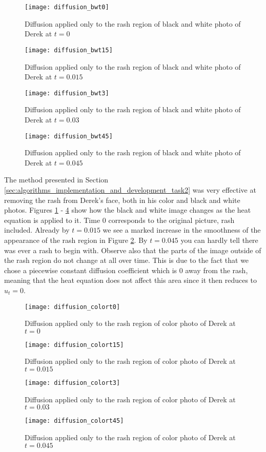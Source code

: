 \documentclass[fleqn,10pt]{../SelfArx} %
\begin{document}
\begin{figure}
\centering
\texttt{[image: diffusion\_bwt0]}
\caption{Diffusion applied only to the rash region of black and white photo of Derek at $t=0$}
\label{fig:diffusion_bwt0}
\end{figure}
\begin{figure}
\centering
\texttt{[image: diffusion\_bwt15]}
\caption{Diffusion applied only to the rash region of black and white photo of Derek at $t=0.015$}
\label{fig:diffusion_bwt15}
\end{figure}
\begin{figure}
\centering
\texttt{[image: diffusion\_bwt3]}
\caption{Diffusion applied only to the rash region of black and white photo of Derek at $t=0.03$}
\label{fig:diffusion_bwt3}
\end{figure}
\begin{figure}
\centering
\texttt{[image: diffusion\_bwt45]}
\caption{Diffusion applied only to the rash region of black and white photo of Derek at $t=0.045$}
\label{fig:diffusion_bwt45}
\end{figure}

The method presented in Section \ref{sec:algorithms_implementation_and_development_task2} was very effective at removing the rash from Derek's face, both in his color and black and white photos. Figures \ref{fig:diffusion_bwt0} - \ref{fig:diffusion_bwt45} show how the black and white image changes as the heat equation is applied to it. Time 0 corresponds to the original picture, rash included. Already by $t=0.015$ we see a marked increase in the smoothness of the appearance of the rash region in Figure \ref{fig:diffusion_bwt15}. By $t=0.045$ you can hardly tell there was ever a rash to begin with. Observe also that the parts of the image outside of the rash region do not change at all over time. This is due to the fact that we chose a piecewise constant diffusion coefficient which is 0 away from the rash, meaning that the heat equation does not affect this area since it then reduces to $u_t = 0$.

\begin{figure}
\centering
\texttt{[image: diffusion\_colort0]}
\caption{Diffusion applied only to the rash region of color photo of Derek at $t=0$}
\label{fig:diffusion_colort0}
\end{figure}
\begin{figure}
\centering
\texttt{[image: diffusion\_colort15]}
\caption{Diffusion applied only to the rash region of color photo of Derek at $t=0.015$}
\label{fig:diffusion_colort15}
\end{figure}
\begin{figure}
\centering
\texttt{[image: diffusion\_colort3]}
\caption{Diffusion applied only to the rash region of color photo of Derek at $t=0.03$}
\label{fig:diffusion_colort3}
\end{figure}
\begin{figure}
\centering
\texttt{[image: diffusion\_colort45]}
\caption{Diffusion applied only to the rash region of color photo of Derek at $t=0.045$}
\label{fig:diffusion_colort45}
\end{figure}
\end{document}

